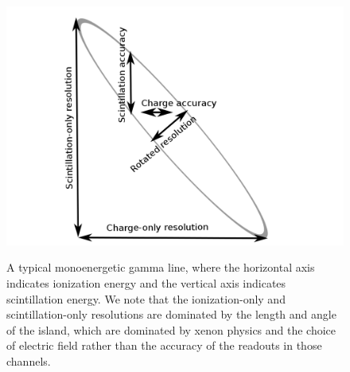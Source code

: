 \begin{figure}
\begin{center}
\includegraphics[keepaspectratio=true,width=.6\textwidth]{RotatedIsland.png}
\end{center}
\renewcommand{\baselinestretch}{1}
\small\normalsize
\begin{quote}
\caption{A typical monoenergetic gamma line, where the horizontal axis indicates ionization energy and the vertical axis indicates scintillation energy.  We note that the ionization-only and scintillation-only resolutions are dominated by the length and angle of the island, which are dominated by xenon physics and the choice of electric field rather than the accuracy of the readouts in those channels.}
\label{fig:RotatedIslandSchematic}
\end{quote}
\end{figure}
\renewcommand{\baselinestretch}{2}
\small\normalsize

